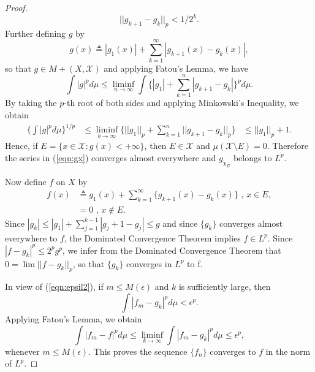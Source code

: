 \documentclass[12pt]{amsart}
\theoremstyle{plain}
\theoremstyle{definition}
\theoremstyle{remark}
\numberwithin{equation}{section}
\numberwithin{thm}{section}
\begin{document}
\begin{proof}
\begin{equation*}
    ||g_{k+1} - g_k||_p < 1/2^k.
\end{equation*}
Further defining $g$ by
\begin{equation} \label{eqn:gx}
    g(x) \triangleq |g_1(x)| + \sum_{k=1}^{\infty} |g_{k+1}(x) - g_k(x)|,
\end{equation}
so that $g \in M+(X,\mathcal{X})$ and applying Fatou's Lemma, we have 
\begin{equation}
    \int |g|^p d\mu \leq \liminf_{n \to \infty} \int \{ |g_1| + \sum _{k=1}^{n} |g_{k+1} - g_k| \}^p d\mu. 
\end{equation}
By taking the $p$-th root of both sides and applying Minkowski's Inequality, we obtain
\begin{equation*}
    \begin{aligned}    
    \{ \int |g|^p d\mu \}^{1/p} & \leq \liminf_{b \to \infty} \{ ||g_1||_p + \sum_{k=1}^n ||g_{k+1} - g_k||_p \} 
    & \leq ||g_1||_p + 1.
    \end{aligned}
\end{equation*}
Hence, if $E=\{ x \in \mathcal{X} : g(x) < +\infty \}$, then $E \in \mathcal{X}$ and $\mu(\mathcal{X} \setminus E)=0$. Therefore the series in (\ref{eqn:gx}) converges almost everywhere and $g_{\chi_E}$ belongs to $L^p$.

Now define $f$ on $X$ by
\begin{equation*}
    \begin{aligned}     
    f(x) & \triangleq g_1(x) + \sum_{k=1}^{\infty}\{ g_{k+1}(x) - g_k(x) \} \text{ , } x \in E, \\
    & = 0 \text{ , } x \notin E.
    \end{aligned}
\end{equation*}
Since $|g_k| \leq |g_1| + \sum_{j=1}^{k-1}|g_j+1-g_j| \leq g$ and since $\{g_k\}$ converges almost everywhere to $f$, the Dominated Convergence Theorem implies $f \in L^p$. Since $|f-g_k|^p \leq 2^p g^p$, we infer from the Dominated Convergence Theorem that $0=\lim||f-g_k||_p$, so that $\{ g_k \}$ converges in $L^p$ to f.

In view of (\ref{eqn:epsil2}), if $m \leq M(\epsilon)$ and $k$ is sufficiently large, then
\begin{equation*}
    \int |f_m -g_k|^p d\mu < \epsilon^p.
\end{equation*}
Applying Fatou's Lemma, we obtain 
\begin{equation*}
    \int |f_m -f|^p d\mu \leq \liminf_{k \to \infty} \int |f_m - g_k|^p d\mu \leq \epsilon^p,
\end{equation*}
whenever $m \leq M(\epsilon)$. This proves the sequence $\{f_n\}$ converges to $f$ in the norm of $L^p$.
 \end{proof}
\end{document}
